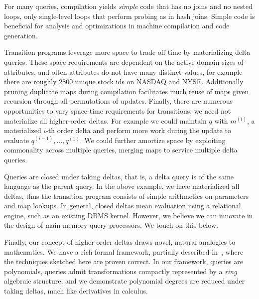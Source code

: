 For many queries, compilation yields \textit{simple} code that has no joins
and no nested loops, only single-level loops that perform probing as
in hash joins.
Simple code is beneficial for analysis and optimizations in machine
compilation and code generation.

Transition programs leverage more space to trade off time by materializing delta
queries. These space requirements are dependent on the active domain sizes of
attributes, and often attributes do not have many distinct values, for example
there are roughly 2800 unique stock ids on NASDAQ and NYSE. Additionally pruning
duplicate maps during compilation facilitates much reuse of maps given recursion
through all permutations of updates. Finally, there are numerous opportunities
to vary space-time requirements for transitions: we need not materialize all
higher-order deltas. For example we could maintain $q$ with $m^{(i)}$, a
materialized $i$-th order delta and perform more work during the update to
evaluate $q^{(i-1)}, \ldots, q^{(1)}$. We could further amortize space by
exploiting commonality across multiple queries, merging maps to service multiple
delta queries.



Queries are closed under taking deltas, that is, a delta query is of the same
language as the parent query. In the above example, we have materialized all
deltas, thus the transition program consists of simple arithmetics on parameters
and map lookups. In general, closed deltas mean evaluation using a relational
engine, such as an existing DBMS kernel. However, we believe we can innovate in
the design of main-memory query processors. We touch on this below.

Finally, our concept of higher-order deltas draws novel, natural analogies to
mathematics. We have a rich formal framework, partially described
in~\cite{koch-pods:10}, where the techniques sketched here are proven correct.
In our framework, queries are polynomials, queries admit transformations
compactly represented by a \textit{ring} algebraic structure, and we demonstrate
polynomial degrees are reduced under taking deltas, much like derivatives in
calculus.

